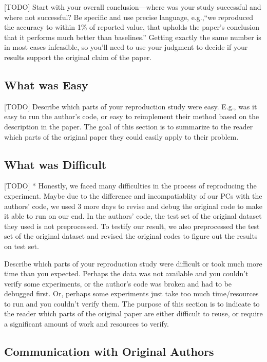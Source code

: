 \documentclass{article}
\begin{document}
[TODO] Start with your overall conclusion---where was your study successful and where not successful? Be specific and use precise language, e.g.,``we reproduced the accuracy to within 1\% of reported value, that upholds the paper's conclusion that it performs much better than baselines.'' Getting exactly the same number is in most cases infeasible, so you'll need to use your judgment to decide if your results support the original claim of the paper. 

\subsection*{What was Easy}

[TODO] Describe which parts of your reproduction study were easy. E.g., was it easy to run the author's code, or easy to reimplement their method based on the description in the paper. The goal of this section is to summarize to the reader which parts of the original paper they could easily apply to their problem. 

\subsection*{What was Difficult}

[TODO] * Honestly, we faced many difficulties in the process of reproducing the experiment. Maybe due to the difference and incompatiablity of our PCs with the authors' code, we used 3 more days to revise and debug the original code to make it able to run on our end. In the authors' code, the test set of the original dataset they used is not preprocessed. To testify our result, we also preprocessed the test set of the original dataset and revised the original codes to figure out the results on test set.

Describe which parts of your reproduction study were difficult or took much more time than you expected. Perhaps the data was not available and you couldn't verify some experiments, or the author's code was broken and had to be debugged first. Or, perhaps some experiments just take too much time/resources to run and you couldn't verify them. The purpose of this section is to indicate to the reader which parts of the original paper are either difficult to reuse, or require a significant amount of work and resources to verify. 

\subsection*{Communication with Original Authors}
\end{document}
